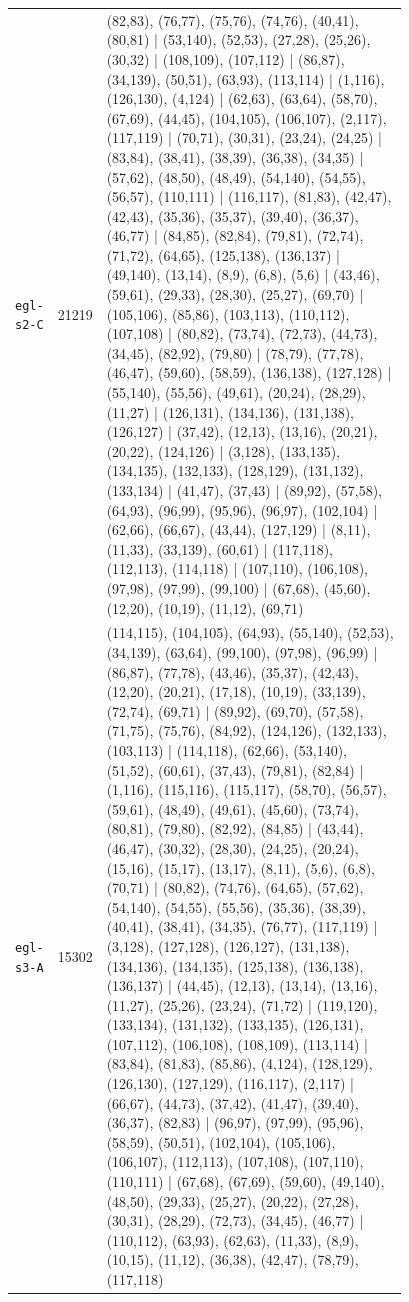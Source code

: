 \begin{landscape}
\begin{longtable}{lr>{\tiny\raggedright\arraybackslash}p{0.78\linewidth}}
\texttt{egl-s2-C} & 21219 & (82,83), (76,77), (75,76), (74,76), (40,41), (80,81) | (53,140), (52,53), (27,28), (25,26), (30,32) | (108,109), (107,112) | (86,87), (34,139), (50,51), (63,93), (113,114) | (1,116), (126,130), (4,124) | (62,63), (63,64), (58,70), (67,69), (44,45), (104,105), (106,107), (2,117), (117,119) | (70,71), (30,31), (23,24), (24,25) | (83,84), (38,41), (38,39), (36,38), (34,35) | (57,62), (48,50), (48,49), (54,140), (54,55), (56,57), (110,111) | (116,117), (81,83), (42,47), (42,43), (35,36), (35,37), (39,40), (36,37), (46,77) | (84,85), (82,84), (79,81), (72,74), (71,72), (64,65), (125,138), (136,137) | (49,140), (13,14), (8,9), (6,8), (5,6) | (43,46), (59,61), (29,33), (28,30), (25,27), (69,70) | (105,106), (85,86), (103,113), (110,112), (107,108) | (80,82), (73,74), (72,73), (44,73), (34,45), (82,92), (79,80) | (78,79), (77,78), (46,47), (59,60), (58,59), (136,138), (127,128) | (55,140), (55,56), (49,61), (20,24), (28,29), (11,27) | (126,131), (134,136), (131,138), (126,127) | (37,42), (12,13), (13,16), (20,21), (20,22), (124,126) | (3,128), (133,135), (134,135), (132,133), (128,129), (131,132), (133,134) | (41,47), (37,43) | (89,92), (57,58), (64,93), (96,99), (95,96), (96,97), (102,104) | (62,66), (66,67), (43,44), (127,129) | (8,11), (11,33), (33,139), (60,61) | (117,118), (112,113), (114,118) | (107,110), (106,108), (97,98), (97,99), (99,100) | (67,68), (45,60), (12,20), (10,19), (11,12), (69,71) \\[2pt]
\texttt{egl-s3-A} & 15302 & (114,115), (104,105), (64,93), (55,140), (52,53), (34,139), (63,64), (99,100), (97,98), (96,99) | (86,87), (77,78), (43,46), (35,37), (42,43), (12,20), (20,21), (17,18), (10,19), (33,139), (72,74), (69,71) | (89,92), (69,70), (57,58), (71,75), (75,76), (84,92), (124,126), (132,133), (103,113) | (114,118), (62,66), (53,140), (51,52), (60,61), (37,43), (79,81), (82,84) | (1,116), (115,116), (115,117), (58,70), (56,57), (59,61), (48,49), (49,61), (45,60), (73,74), (80,81), (79,80), (82,92), (84,85) | (43,44), (46,47), (30,32), (28,30), (24,25), (20,24), (15,16), (15,17), (13,17), (8,11), (5,6), (6,8), (70,71) | (80,82), (74,76), (64,65), (57,62), (54,140), (54,55), (55,56), (35,36), (38,39), (40,41), (38,41), (34,35), (76,77), (117,119) | (3,128), (127,128), (126,127), (131,138), (134,136), (134,135), (125,138), (136,138), (136,137) | (44,45), (12,13), (13,14), (13,16), (11,27), (25,26), (23,24), (71,72) | (119,120), (133,134), (131,132), (133,135), (126,131), (107,112), (106,108), (108,109), (113,114) | (83,84), (81,83), (85,86), (4,124), (128,129), (126,130), (127,129), (116,117), (2,117) | (66,67), (44,73), (37,42), (41,47), (39,40), (36,37), (82,83) | (96,97), (97,99), (95,96), (58,59), (50,51), (102,104), (105,106), (106,107), (112,113), (107,108), (107,110), (110,111) | (67,68), (67,69), (59,60), (49,140), (48,50), (29,33), (25,27), (20,22), (27,28), (30,31), (28,29), (72,73), (34,45), (46,77) | (110,112), (63,93), (62,63), (11,33), (8,9), (10,15), (11,12), (36,38), (42,47), (78,79), (117,118) \\[2pt]

\end{longtable}
\end{landscape}
